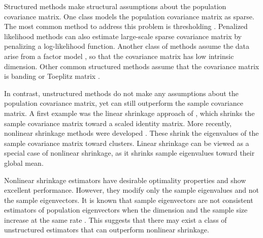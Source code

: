 \documentclass[useAMS,referee,usenatbib]{biom}
\begin{document}
Structured methods make structural assumptions about the population covariance matrix. One class models the population covariance matrix as sparse. The most common method to address this problem is thresholding \citep{rothman2009generalized, cai2011adaptive}. Penalized likelihood methods \citep{xue2012positive} can also estimate large-scale sparse covariance matrix by penalizing a log-likelihood function. Another class of methods assume the data arise from a factor model \citep{fan2008high}, so that the covariance matrix has low intrinsic dimension. Other common structured methods assume that the covariance matrix is banding \citep{li2017estimation} or Toeplitz matrix \citep{liu2017covariance}. 

In contrast, unstructured methods do not make any assumptions about the population covariance matrix, yet can still outperform the sample covariance matrix. A first example was the linear shrinkage approach of \citet{ledoit2004well}, which shrinks the sample covariance matrix toward a scaled identity matrix. More recently, nonlinear shrinkage methods were developed \citep{ledoit2012nonlinear, ledoit2019quadratic, lam2016nonparametric}. These shrink the eigenvalues of the sample covariance matrix toward clusters. Linear shrinkage can be viewed as a special case of nonlinear shrinkage, as it shrinks sample eigenvalues toward their global mean.

Nonlinear shrinkage estimators have desirable optimality properties \citep{ledoit2018analytical} and show excellent performance. However, they modify only the sample eigenvalues and not the sample eigenvectors. It is known that sample eigenvectors are not consistent estimators of population eigenvectors when the dimension and the sample size increase at the same rate \citep{mestre2008asymptotic}. This suggests that there may exist a class of unstructured estimators that can outperform nonlinear shrinkage.

\end{document}
